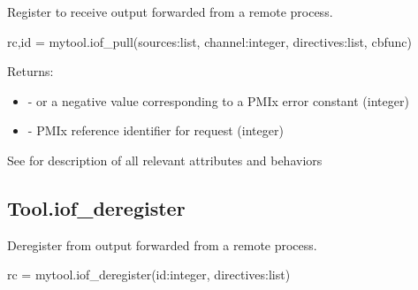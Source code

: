 \summary

Register to receive output forwarded from a remote process.

\format

\pyspecificstart
\begin{codepar}
rc,id = mytool.iof_pull(sources:list, channel:integer, directives:list, cbfunc)
\end{codepar}
\pyspecificend

\begin{arglist}
\end{arglist}

Returns:

\begin{itemize}
    \item {} -  or a negative value corresponding to a PMIx error constant (integer)
    \item {} - \ac{PMIx} reference identifier for request (integer)
\end{itemize}


See  for description of all relevant attributes and behaviors


\subsection{Tool.iof_deregister}

\summary

Deregister from output forwarded from a remote process.

\format

\pyspecificstart
\begin{codepar}
rc = mytool.iof_deregister(id:integer, directives:list)
\end{codepar}
\pyspecificend

\begin{arglist}
\end{arglist}


